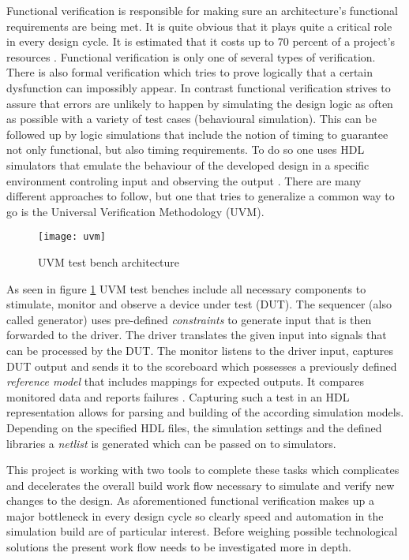 Functional verification is responsible for making sure an architecture's functional requirements are being met. It is quite obvious that it plays quite a critical role in every design cycle. It is estimated that it costs up to 70 percent of a project's resources \cite[p. 286]{Fine03}. Functional verification is only one of several types of verification. There is also formal verification which tries to prove logically that a certain dysfunction can impossibly appear. In contrast functional verification strives to assure that errors are unlikely to happen by simulating the design logic as often as possible with a variety of test cases (behavioural simulation). This can be followed up by logic simulations that include the notion of timing to guarantee not only functional, but also timing requirements. To do so one uses \acs{HDL} simulators that emulate the behaviour of the developed design in a specific environment controling input and observing the output \cite[see][pp. 7ff]{Xi18}. There are many different approaches to follow, but one that tries to generalize a common way to go is the Universal Verification Methodology (UVM). 

\begin{figure}[h]
  \centering
      \texttt{[image: uvm]}
  \caption[\acs{UVM} testbench] {\acs{UVM} test bench architecture \cite{Pavi17}}
  \label{fig:uvm}
\end{figure}
\noindent
As seen in figure \ref{fig:uvm} \acs{UVM} test benches include all necessary components to stimulate, monitor and observe a device under test (DUT). The sequencer (also called generator) uses pre-defined \textit{constraints} to generate input that is then forwarded to the driver. The driver translates the given input into signals that can be processed by the \acs{DUT}. The monitor listens to the driver input, captures \acs{DUT} output and sends it to the scoreboard which possesses a previously defined \textit{reference model} that includes mappings for expected outputs. It compares monitored data and reports failures \cite[see][p. 2]{Pavi17}.
Capturing such a test in an \acs{HDL} representation allows for parsing and building of the according simulation models. Depending on the specified \acs{HDL} files, the simulation settings and the defined libraries a \textit{netlist} is generated which can be passed on to simulators. 

This project is working with two tools to complete these tasks which complicates and decelerates the overall build work flow necessary to simulate and verify new changes to the design. As aforementioned functional verification makes up a major bottleneck in every design cycle so clearly speed and automation in the simulation build are of particular interest. Before weighing possible technological solutions the present work flow needs to be investigated more in depth.